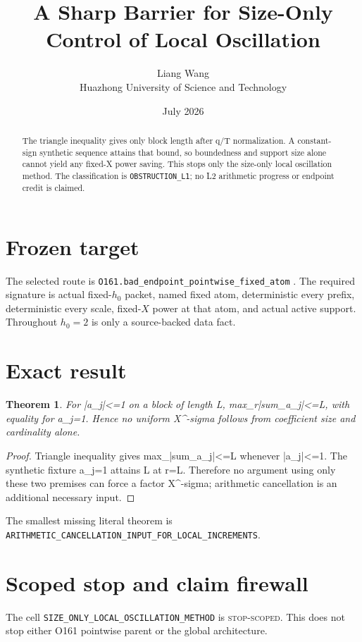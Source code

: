 \documentclass[11pt]{article}
\title{\textbf{A Sharp Barrier for Size-Only Control of Local Oscillation}}
\author{Liang Wang\\Huazhong University of Science and Technology}
\date{July 2026}
\newtheorem{theorem}{Theorem}
\begin{document}
\maketitle
\begin{abstract}
The triangle inequality gives only block length after q/T normalization.  A constant-sign synthetic sequence attains that bound, so boundedness and support size alone cannot yield any fixed-X power saving.  This stops only the size-only local oscillation method.
The classification is \texttt{OBSTRUCTION\_\allowbreak{}L1}; no L2 arithmetic
progress or endpoint credit is claimed.
\end{abstract}

\section{Frozen target}
The selected route is \texttt{O161.bad\_\allowbreak{}endpoint\_\allowbreak{}pointwise\_\allowbreak{}fixed\_\allowbreak{}atom} \citep{TPC182}.  The required
signature is actual fixed-$h_0$ packet, named fixed atom, deterministic every
prefix, deterministic every scale, fixed-$X$ power at that atom, and actual
active support.  Throughout $h_0=2$ is only a source-backed data fact.

\section{Exact result}
\begin{theorem}
For |a\_\allowbreak{}j|<=1 on a block of length L, max\_\allowbreak{}r|sum\_a\_\allowbreak{}j|<=L, with equality for a\_\allowbreak{}j=1.  Hence no uniform X\^{}{-sigma} follows from coefficient size and cardinality alone.
\end{theorem}
\begin{proof}
Triangle inequality gives max\_|sum\_a\_\allowbreak{}j|<=L whenever |a\_\allowbreak{}j|<=1.  The synthetic fixture a\_\allowbreak{}j=1 attains L at r=L.  Therefore no argument using only these two premises can force a factor X\^{}{-sigma}; arithmetic cancellation is an additional necessary input.
\end{proof}

The smallest missing literal theorem is
\texttt{ARITHMETIC\_\allowbreak{}CANCELLATION\_\allowbreak{}INPUT\_\allowbreak{}FOR\_\allowbreak{}LOCAL\_\allowbreak{}INCREMENTS}.

\section{Scoped stop and claim firewall}
The cell \texttt{SIZE\_\allowbreak{}ONLY\_\allowbreak{}LOCAL\_\allowbreak{}OSCILLATION\_\allowbreak{}METHOD} is \textsc{stop-scoped}. This does not stop either O161 pointwise parent or the global architecture.
\end{document}
